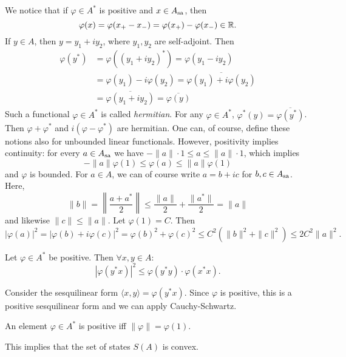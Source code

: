 We notice that if $\varphi \in A^*$ is positive and $x \in A_{\operatorname{sa}}$,
then $$\varphi(x) = \varphi(x_+ - x_-) = \varphi (x_+) - \varphi(x_-) \in \mathbb {R}.$$
If $y \in A$, then $y = y_1 + i y_2$, where $y_1, y_2$ are self-adjoint.
Then \begin{align*}
  \varphi(y^*) &= \varphi((y_1 + i y_2)^*) = \varphi (y_1 - i y_2)\\
  &= \varphi (y_1) - i \varphi(y_2) = \overline{\varphi(y_1) + i \varphi (y_2)}\\
  &= \overline{\varphi (y_1 + i y_2)} = \overline{\varphi(y)}
\end{align*}
Such a functional $\varphi \in A^*$ is called \emph{hermitian}.
For any $\varphi \in A^*$, $\varphi^* (y) = \overline{\varphi(y^*)}$.
Then $\varphi + \varphi^*$ and $i(\varphi - \varphi^*)$ are hermitian.
One can, of course, define these notions also for unbounded linear functionals.
However, positivity implies continuity: for every $a \in A_{\operatorname{sa}}$ we have 
$-\| a\| \cdot 1 \leq a \leq \| a\| \cdot 1$, which implies
$$-\| a\| \varphi(1) \leq \varphi(a) \leq \| a\| \varphi(1)$$
and $\varphi$ is bounded.
For $a \in A$, we can of course write $a = b + ic$ for $b, c \in A_{\operatorname{sa}}$.
Here, $$\|b\| = \left\| \frac{a + a^*}{2} \right\| \leq \frac{\| a\|}{2} + \frac{\| a^*\|}{2} = \|a\|$$ and likewise $\|c\| \leq \|a\|$. Let $\varphi(1) = C$.
Then 
$$|\varphi(a)|^2 = |\varphi(b) + i\varphi(c)|^2 = \varphi(b)^2 + \varphi(c)^2 \leq C^2 (\|b\|^2 + \|c\|^2) \leq 2 C^2 \|a\|^2.$$

\begin{lemma}
  Let $\varphi \in A^*$ be positive. Then $\forall x, y \in A$:
  $$|\varphi(y^* x)|^2 \leq \varphi (y^* y) \cdot \varphi(x^* x).$$
\end{lemma}

\begin{myproof}
  Consider the sesquilinear form
  $\langle x, y \rangle = \varphi (y^* x)$.
  Since $\varphi$ is positive, this is a positive sesquilinear form and we can apply Cauchy-Schwartz. 
\end{myproof}

\begin{theorem}\label{thm:3.1}
  An element $\varphi \in A^*$ is positive iff $\| \varphi \| = \varphi(1).$
\end{theorem}

\begin{remark}
  This implies that the set of states $S(A)$ is convex.
\end{remark}

